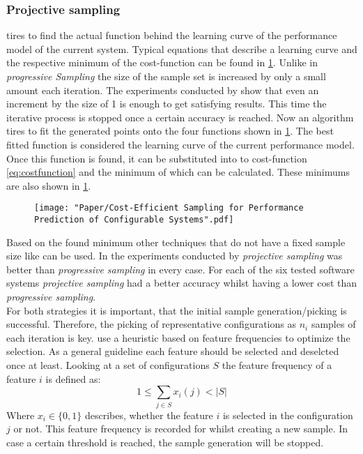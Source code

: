 \subsubsection{Projective sampling} tires to find the actual function behind the learning curve of the performance model of the current system. Typical equations that describe a learning curve and the respective minimum of the cost-function can be found in \cref{tab:learningCurveFunction}.
Unlike in \textit{progressive Sampling} the size of the sample set is increased by only a small amount each iteration. The experiments conducted by \citet{CostEfficientSampling_Gou_Siegmund_2015} show that even an increment by the size of 1 is enough to get satisfying results. This time the iterative process is stopped once a certain accuracy is reached. Now an algorithm tires to fit the generated points onto the four functions shown in \cref{tab:learningCurveFunction}. The best fitted function is considered the learning curve of the current performance model. Once this function is found, it can be substituted into to cost-function \cref{eq:costfunction} and the minimum of which can be calculated. These minimums are also shown in \cref{tab:learningCurveFunction}.
\begin{figure}[h]
	\centering
	\label{tab:learningCurveFunction}
	\texttt{[image: "Paper/Cost-Efficient Sampling for Performance Prediction of Configurable Systems".pdf]}
\end{figure}

Based on the found minimum other techniques that do not have a fixed sample size like \VAPP can be used. In the experiments conducted by \citet{CostEfficientSampling_Gou_Siegmund_2015} \textit{projective sampling} was better than \textit{progressive sampling} in every case. For each of the six tested software systems \textit{projective sampling} had a better accuracy whilst having a lower cost than \textit{progressive sampling}.\\
For both strategies it is important, that the initial sample generation/picking is successful. Therefore, the picking of representative configurations as $n_i$ samples of each iteration is key. 
\citet{CostEfficientSampling_Gou_Siegmund_2015} use a heuristic based on feature frequencies to optimize the selection. As a general guideline each feature should be selected and deselcted once at least. Looking at a set of configurations $S$ the feature frequency of a feature $i$ is defined as:
\begin{equation}
	1 \leq \sum_{j\in S} x_i(j) < |S|
\end{equation}
Where $x_i\in\{0,1\}$ describes, whether the feature $i$ is selected in the configuration $j$ or not. This feature frequency is recorded for whilst creating a new sample. In case a certain threshold is reached, the sample generation will be stopped.